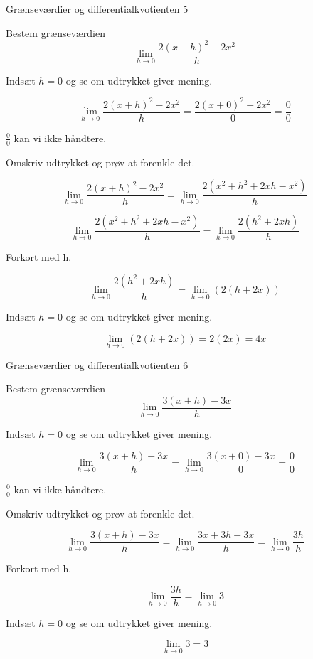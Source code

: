 \documentclass{article}
\begin{document}
\newpage
\begin{exercise}{Grænseværdier og differentialkvotienten 5}

Bestem grænseværdien
\[
\lim_{h \to 0} \frac{2(x + h)^2 - 2x^2}{h}
\]


\hint
Indsæt $h=0$ og se om udtrykket giver mening.

\hint
\[
\lim_{h \to 0} \frac{2(x + h)^2 - 2x^2}{h} = \frac{2(x + 0)^2 - 2x^2}{0} = \frac{0}{0}
\]

\hint
$\frac{0}{0}$ kan vi ikke håndtere.

\hint
Omskriv udtrykket og prøv at forenkle det.

\hint
\[
\lim_{h \to 0} \frac{2(x + h)^2 - 2x^2}{h} = \lim_{h \to 0} \frac{2\left(x^2 + h^2 + 2xh - x^2\right)}{h}
\]

\hint
\[
\lim_{h \to 0} \frac{2\left(x^2 + h^2 + 2xh - x^2\right)}{h} = \lim_{h \to 0} \frac{2\left(h^2 + 2xh\right)}{h}
\]

\hint
Forkort med h.

\hint
\[
\lim_{h \to 0} \frac{2\left(h^2 + 2xh\right)}{h} = \lim_{h \to 0} \left(2(h + 2x)\right)
\]

\hint
Indsæt $h=0$ og se om udtrykket giver mening.

\hint
\[
\lim_{h \to 0} \left(2(h + 2x)\right) = 2(2x) = 4x
\]

\end{exercise}

\newpage
\begin{exercise}{Grænseværdier og differentialkvotienten 6}

Bestem grænseværdien
\[
\lim_{h \to 0} \frac{3(x + h)-3x}{h}
\]


\hint
Indsæt $h=0$ og se om udtrykket giver mening.

\hint
\[
\lim_{h \to 0} \frac{3(x + h)-3x}{h} =\lim_{h \to 0} \frac{3(x + 0)-3x}{0} = \frac{0}{0}
\]

\hint
$\frac{0}{0}$ kan vi ikke håndtere.

\hint
Omskriv udtrykket og prøv at forenkle det.

\hint
\[
\lim_{h \to 0} \frac{3(x + h)-3x}{h} = \lim_{h \to 0} \frac{3x + 3h - 3x}{h} = \lim_{h \to 0} \frac{3h}{h}
\]

\hint
Forkort med h.

\hint
\[
\lim_{h \to 0} \frac{3h}{h} = \lim_{h \to 0} 3
\]

\hint
Indsæt $h=0$ og se om udtrykket giver mening.

\hint
\[
\lim_{h \to 0} 3 = 3
\]

\end{exercise}
\end{document}
